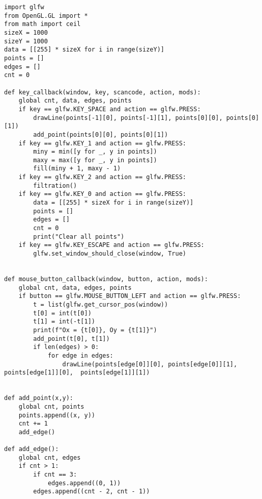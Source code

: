 \documentclass[a4paper, 14pt]{extarticle}
\begin{document}
\begin{verbatim}
import glfw
from OpenGL.GL import *
from math import ceil
sizeX = 1000
sizeY = 1000
data = [[255] * sizeX for i in range(sizeY)]
points = []
edges = []
cnt = 0

def key_callback(window, key, scancode, action, mods):
    global cnt, data, edges, points
    if key == glfw.KEY_SPACE and action == glfw.PRESS:
        drawLine(points[-1][0], points[-1][1], points[0][0], points[0][1])
        add_point(points[0][0], points[0][1])
    if key == glfw.KEY_1 and action == glfw.PRESS:
        miny = min([y for _, y in points])
        maxy = max([y for _, y in points])
        fill(miny + 1, maxy - 1)
    if key == glfw.KEY_2 and action == glfw.PRESS:
        filtration()
    if key == glfw.KEY_0 and action == glfw.PRESS:
        data = [[255] * sizeX for i in range(sizeY)]
        points = []
        edges = []
        cnt = 0
        print("Clear all points")
    if key == glfw.KEY_ESCAPE and action == glfw.PRESS:
        glfw.set_window_should_close(window, True)


def mouse_button_callback(window, button, action, mods):
    global cnt, data, edges, points
    if button == glfw.MOUSE_BUTTON_LEFT and action == glfw.PRESS:
        t = list(glfw.get_cursor_pos(window))
        t[0] = int(t[0])
        t[1] = int(-t[1])
        print(f"Ox = {t[0]}, Oy = {t[1]}")
        add_point(t[0], t[1])
        if len(edges) > 0:
            for edge in edges:
                drawLine(points[edge[0]][0], points[edge[0]][1], points[edge[1]][0],  points[edge[1]][1])
            

def add_point(x,y):
    global cnt, points
    points.append((x, y))
    cnt += 1
    add_edge()

def add_edge():
    global cnt, edges
    if cnt > 1:
        if cnt == 3:
            edges.append((0, 1)) 
        edges.append((cnt - 2, cnt - 1))


\end{verbatim}
\end{document}
